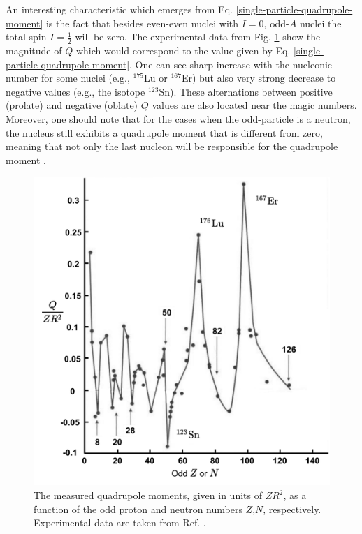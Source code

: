An interesting characteristic which emerges from Eq. \ref{single-particle-quadrupole-moment} is the fact that besides even-even nuclei with $I=0$, odd-$A$ nuclei the total spin $I=\frac{1}{2}$ will be zero. The experimental data from Fig. \ref{experimental-Q-odd-nuclei} show the magnitude of $Q$ which would correspond to the value given by Eq. \ref{single-particle-quadrupole-moment}. One can see sharp increase with the nucleonic number for some nuclei (e.g., $^{175}$Lu or $^{167}$Er) but also very strong decrease to negative values (e.g., the isotope $^{123}$Sn). These alternations between positive (prolate) and negative (oblate) $Q$ values are also located near the magic numbers. Moreover, one should note that for the cases when the odd-particle is a neutron, the nucleus still exhibits a quadrupole moment that is different from zero, meaning that not only the last nucleon will be responsible for the quadrupole moment \cite{bertulani2007nuclear}.

\begin{figure}
    \centering
    \includegraphics[scale=0.65]{Chapters/Figures/Exp_quadrupoleMoments.pdf}
    \caption{The measured quadrupole moments, given in units of $ZR^2$, as a function of the odd proton and neutron numbers $Z$,$N$, respectively. Experimental data are taken from Ref. \cite{bertulani2007nuclear}.}
    \label{experimental-Q-odd-nuclei}
\end{figure}

